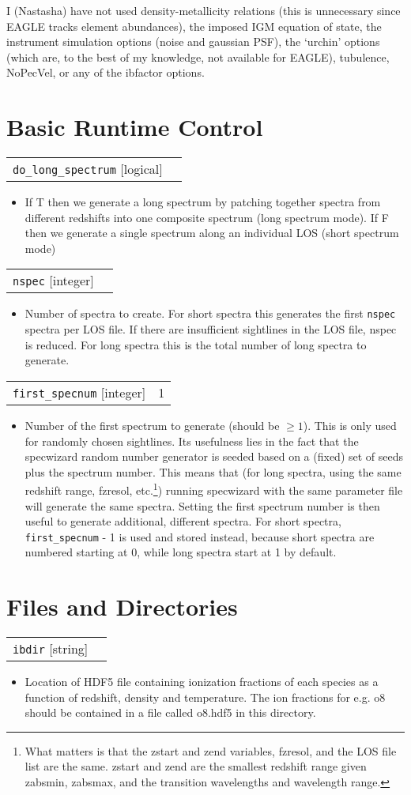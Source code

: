 \documentclass{report}
\makeatletter
\newcommand{\paramdefinition}[3]{
\begin{tabular*}{\textwidth}{l@{\extracolsep{\fill}}r}
		{\tt #1} [{\sc #2}]& #3 \\
\end{tabular*}}
\newcommand{\paramdescription}[1]{
\begin{itemize}
\item #1
\end{itemize}\vspace{0.2cm}}
\newcommand{\param}[1]{{\tt #1}}
\makeatother
\begin{document}
I (Nastasha) have not used density-metallicity relations (this is unnecessary since EAGLE tracks element abundances), the imposed IGM equation of state, the instrument simulation options (noise and gaussian PSF),  the `urchin' options (which are, to the best of my knowledge, not available for EAGLE), tubulence, NoPecVel, or any of the ibfactor options. 


\section{Basic Runtime Control}

\paramdefinition{do\_long\_spectrum}{logical}{}
\paramdescription{If T then we generate a long spectrum by patching together spectra from different redshifts into one composite spectrum (long spectrum mode).  If F then we generate a single spectrum along an individual LOS (short spectrum mode)}

\paramdefinition{nspec}{integer}{}
\paramdescription{Number of spectra to create.  For short spectra this generates the first {\tt nspec} spectra per LOS file. If there are insufficient sightlines in the LOS file, nspec is reduced. For long spectra this is the total number of long spectra to generate.}

\paramdefinition{first\_specnum}{integer}{1}
\paramdescription{Number of the first spectrum to generate (should be $\geq 1$). This is only used for randomly chosen sightlines. Its usefulness lies in the fact that the specwizard random number generator is seeded based on a (fixed) set of seeds plus the spectrum number. This means that (for long spectra, using the same redshift range, fzresol, etc.\footnote{What matters is that the zstart and zend variables, fzresol, and the LOS file list are the same. zstart and zend are the smallest redshift range given zabsmin, zabsmax, and the transition wavelengths and wavelength range.}) running specwizard with the same parameter file will generate the same spectra. Setting the first spectrum number is then useful to generate additional, different spectra. For short spectra, \param{first\_specnum} - 1 is used and stored instead, because short spectra are numbered starting at 0, while long spectra start at 1 by default.}

\section{Files and Directories}

\paramdefinition{ibdir}{string}{}
\paramdescription{Location of HDF5 file containing ionization fractions of each species as a function of redshift, density and temperature. The ion fractions for e.g. o8 should be contained in a file called o8.hdf5 in this directory.}
\end{document}
